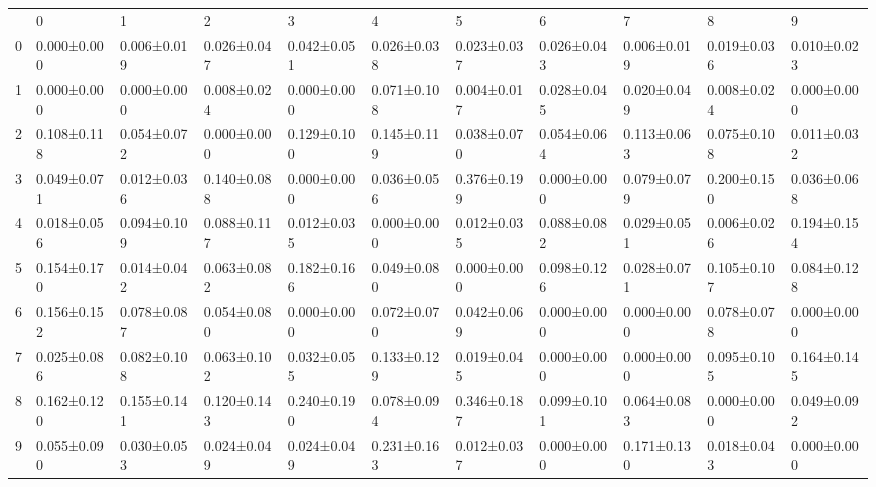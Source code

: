 \begin{tabular}{lllllllllll}
 & 0 & 1 & 2 & 3 & 4 & 5 & 6 & 7 & 8 & 9 \\
0 & 0.000±0.000 & 0.006±0.019 & 0.026±0.047 & 0.042±0.051 & 0.026±0.038 & 0.023±0.037 & 0.026±0.043 & 0.006±0.019 & 0.019±0.036 & 0.010±0.023 \\
1 & 0.000±0.000 & 0.000±0.000 & 0.008±0.024 & 0.000±0.000 & 0.071±0.108 & 0.004±0.017 & 0.028±0.045 & 0.020±0.049 & 0.008±0.024 & 0.000±0.000 \\
2 & 0.108±0.118 & 0.054±0.072 & 0.000±0.000 & 0.129±0.100 & 0.145±0.119 & 0.038±0.070 & 0.054±0.064 & 0.113±0.063 & 0.075±0.108 & 0.011±0.032 \\
3 & 0.049±0.071 & 0.012±0.036 & 0.140±0.088 & 0.000±0.000 & 0.036±0.056 & 0.376±0.199 & 0.000±0.000 & 0.079±0.079 & 0.200±0.150 & 0.036±0.068 \\
4 & 0.018±0.056 & 0.094±0.109 & 0.088±0.117 & 0.012±0.035 & 0.000±0.000 & 0.012±0.035 & 0.088±0.082 & 0.029±0.051 & 0.006±0.026 & 0.194±0.154 \\
5 & 0.154±0.170 & 0.014±0.042 & 0.063±0.082 & 0.182±0.166 & 0.049±0.080 & 0.000±0.000 & 0.098±0.126 & 0.028±0.071 & 0.105±0.107 & 0.084±0.128 \\
6 & 0.156±0.152 & 0.078±0.087 & 0.054±0.080 & 0.000±0.000 & 0.072±0.070 & 0.042±0.069 & 0.000±0.000 & 0.000±0.000 & 0.078±0.078 & 0.000±0.000 \\
7 & 0.025±0.086 & 0.082±0.108 & 0.063±0.102 & 0.032±0.055 & 0.133±0.129 & 0.019±0.045 & 0.000±0.000 & 0.000±0.000 & 0.095±0.105 & 0.164±0.145 \\
8 & 0.162±0.120 & 0.155±0.141 & 0.120±0.143 & 0.240±0.190 & 0.078±0.094 & 0.346±0.187 & 0.099±0.101 & 0.064±0.083 & 0.000±0.000 & 0.049±0.092 \\
9 & 0.055±0.090 & 0.030±0.053 & 0.024±0.049 & 0.024±0.049 & 0.231±0.163 & 0.012±0.037 & 0.000±0.000 & 0.171±0.130 & 0.018±0.043 & 0.000±0.000 \\
\end{tabular}
